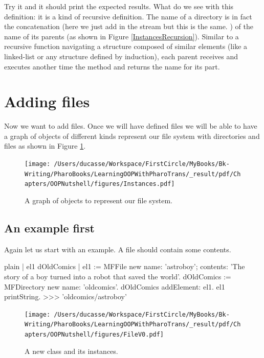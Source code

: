 \documentclass[10pt,twoside,english]{_support/latex/sbabook/sbabook}
\begin{document}
Try it and it should print the expected results.
What do we see with this definition: it is a kind of recursive definition. The name of a directory is in fact the concatenation (here we just add in the stream but this is the same. ) of the name of its parents (as shown in Figure \ref{InstancesRecursion}).
Similar to a recursive function navigating a structure composed of similar elements (like a linked-list or any structure defined by induction), each parent receives and executes another time the  method and returns the name for its part.
\section{Adding files}
Now we want to add files. Once we will have defined files we will be able to have a graph of objects of different kinds represent our file system with directories and files as shown in Figure \ref{Instances}.


\begin{figure}

\begin{center}
\texttt{[image: /Users/ducasse/Workspace/FirstCircle/MyBooks/Bk-Writing/PharoBooks/LearningOOPWithPharoTrans/\_result/pdf/Chapters/OOPNutshell/figures/Instances.pdf]}\caption{A graph of objects to represent our file system. \label{Instances}}\end{center}
\end{figure}

\subsection{An example first}
Again let us start with an example.  A file should contain some contents. 

\begin{displaycode}{plain}
| el1 dOldComics |
el1 := MFFile new name: 'astroboy'; contents: 'The story of a boy turned into a robot that saved the world'.
dOldComics := MFDirectory new name: 'oldcomics'.
dOldComics addElement: el1. 
el1 printString.
>>>
'oldcomics/astroboy'
\end{displaycode}


\begin{figure}

\begin{center}
\texttt{[image: /Users/ducasse/Workspace/FirstCircle/MyBooks/Bk-Writing/PharoBooks/LearningOOPWithPharoTrans/\_result/pdf/Chapters/OOPNutshell/figures/FileV0.pdf]}\caption{A new class and its instances.\label{FileV0}}\end{center}
\end{figure}
\end{document}
